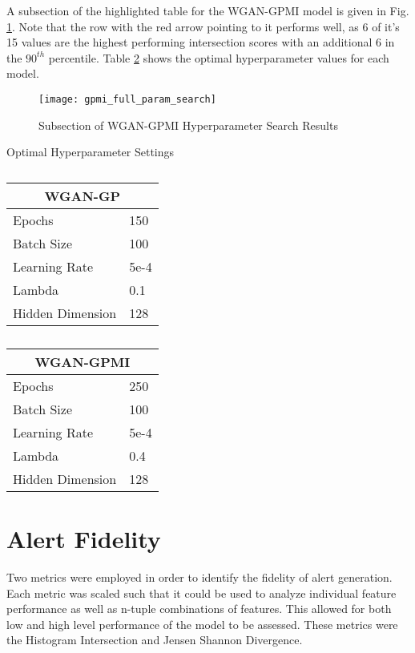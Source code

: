 A subsection of the highlighted table for the WGAN-GPMI model is given in Fig. \ref{fig:highlighted_param_gpmi}. Note that the row with the red arrow pointing to it performs well, as 6 of it's 15 values are the highest performing intersection scores with an additional 6 in the $90^{th}$ percentile. Table \ref{tab:params} shows the optimal hyperparameter values for each model.

\begin{figure}[!htbp]
	\centering
	\texttt{[image: gpmi\_full\_param\_search]}
	\caption{
		Subsection of WGAN-GPMI Hyperparameter Search Results
	}
	\label{fig:highlighted_param_gpmi}
\end{figure}

\begin{table}[!htb]
	\centering
	\caption{Optimal Hyperparameter Settings}
	\label{tab:params}
	\begin{subtable}{.5\linewidth}
		\centering
		\caption{}
		\begin{tabular}{l|l}
			\hline
			\multicolumn{2}{c}{\textbf{WGAN-GP}} \\
			\hline
			Epochs & 150 \\
			Batch Size & 100 \\
			Learning Rate & 5e-4 \\
			Lambda & 0.1 \\
			Hidden Dimension & 128
		\end{tabular}
	\end{subtable}%
	\begin{subtable}{.5\linewidth}
		\centering
		\caption{}
		\begin{tabular}{l|l}
			\hline
			\multicolumn{2}{c}{\textbf{ WGAN-GPMI}} \\
			\hline
			Epochs & 250 \\
			Batch Size & 100 \\
			Learning Rate & 5e-4 \\
			Lambda & 0.4 \\
			Hidden Dimension & 128
		\end{tabular}
	\end{subtable}%
\end{table}

\section{Alert Fidelity}
\label{sec:fidel}

Two metrics were employed in order to identify the fidelity of alert generation. Each metric was scaled such that it could be used to analyze individual feature performance as well as n-tuple combinations of features. This allowed for both low and high level performance of the model to be assessed. These metrics were the Histogram Intersection and Jensen Shannon Divergence.


